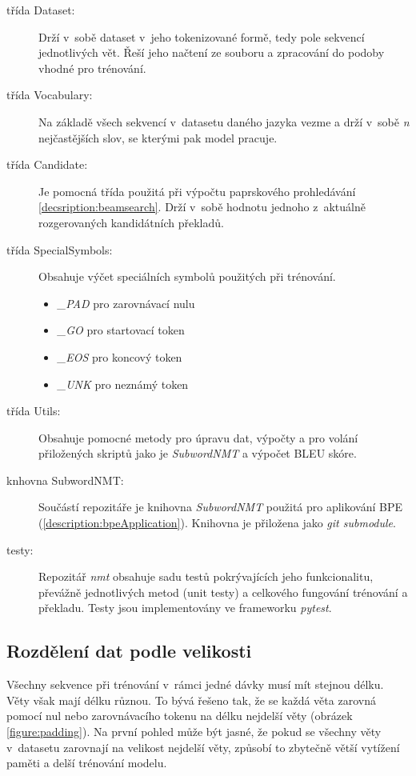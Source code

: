 \begin{description}
  \item[třída Dataset:] Drží v~sobě dataset v~jeho tokenizované formě, tedy pole sekvencí jednotlivých vět. Řeší jeho načtení ze souboru a zpracování do podoby vhodné pro trénování.
  \item[třída Vocabulary:] Na základě všech sekvencí v~datasetu daného jazyka vezme a drží v~sobě \emph{n} nejčastějších slov, se kterými pak model pracuje.
  \item[třída Candidate:] Je pomocná třída použitá při výpočtu paprskového prohledávání \ref{decsription:beamsearch}. Drží v~sobě hodnotu jednoho z~aktuálně rozgerovaných kandidátních překladů.
  \item[třída SpecialSymbols:] Obsahuje výčet speciálních symbolů použitých při trénování. \begin{itemize}
                  \item \emph{\_PAD} pro zarovnávací nulu
                  \item \emph{\_GO} pro startovací token
                  \item \emph{\_EOS} pro koncový token
                  \item \emph{\_UNK} pro neznámý token
                \end{itemize}
  \item[třída Utils:] Obsahuje pomocné metody pro úpravu dat, výpočty a pro volání přiložených skriptů jako je \emph{SubwordNMT} a výpočet BLEU skóre.
  \item[knhovna SubwordNMT:] Součástí repozitáře je knihovna \emph{SubwordNMT} použitá pro aplikování BPE (\ref{description:bpeApplication}). Knihovna je přiložena jako \emph{git submodule}.
  \item[testy:] Repozitář \emph{nmt} obsahuje sadu testů pokrývajících jeho funkcionalitu, převážně jednotlivých metod (unit testy) a celkového fungování trénování a překladu. Testy jsou implementovány ve frameworku \emph{pytest}.
\end{description}

\subsection{Rozdělení dat podle velikosti}\label{subsection:Bucketing}
Všechny sekvence při trénování v~rámci jedné dávky musí mít stejnou délku. Věty však mají délku různou. To bývá řešeno tak, že se každá věta zarovná pomocí nul nebo zarovnávacího tokenu na délku nejdelší věty (obrázek \ref{figure:padding}). Na první pohled může být jasné, že pokud se všechny věty v~datasetu zarovnají na velikost nejdelší věty, způsobí to zbytečně větší vytížení paměti a delší trénování modelu.

